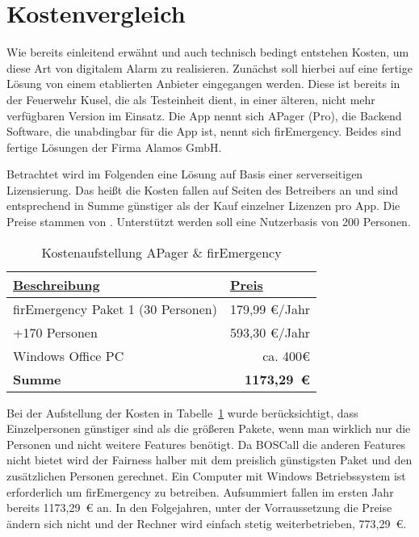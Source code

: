 \section{Kostenvergleich}
\label{sec:kostenvergleich}
Wie bereits einleitend erwähnt und auch technisch bedingt entstehen Kosten, um diese Art von digitalem Alarm zu realisieren. Zunächst soll hierbei auf eine fertige Lösung von einem etablierten Anbieter eingegangen werden. Diese ist bereits in der Feuerwehr Kusel, die als Testeinheit dient, in einer älteren, nicht mehr verfügbaren Version im Einsatz. Die App nennt sich APager (Pro), die Backend Software, die unabdingbar für die App ist, nennt sich firEmergency. Beides sind fertige Lösungen der Firma Alamos GmbH.

Betrachtet wird im Folgenden eine Lösung auf Basis einer serverseitigen Lizensierung. Das heißt die Kosten fallen auf Seiten des Betreibers an und sind entsprechend in Summe günstiger als der Kauf einzelner Lizenzen pro App. Die Preise stammen von \cite{Alamos:FE2Pricing}. Unterstützt werden soll eine Nutzerbasis von 200 Personen.
\begin{table}[H]
	\centering
	\caption{Kostenaufstellung APager \& firEmergency}
	\label{tbl:FE2Pricing}
	\begin{tabular}{|l|r|}
		\hline
		{\ul \textbf{Beschreibung}}        & \multicolumn{1}{l|}{{\ul \textbf{Preis}}} \\ \hline
		firEmergency Paket 1 (30 Personen) & 179,99 €/Jahr                             \\ \hline
		+170 Personen                      & 593,30 €/Jahr                             \\ \hline
		Windows Office PC                  & ca. 400€                                  \\ \hline\hline
		\textbf{Summe}                  & \textbf{1173,29~€}                                  \\ \hline
	\end{tabular}
\end{table}

Bei der Aufstellung der Kosten in Tabelle~\ref{tbl:FE2Pricing} wurde berücksichtigt, dass Einzelpersonen günstiger sind als die größeren Pakete, wenn man wirklich nur die Personen und nicht weitere Features benötigt. Da BOSCall die anderen Features nicht bietet wird der Fairness halber mit dem preislich günstigsten Paket und den zusätzlichen Personen gerechnet. Ein Computer mit Windows Betriebssystem ist erforderlich um firEmergency zu betreiben.\cite{Alamos:FE2SystemRequirements} Aufsummiert fallen im ersten Jahr bereits 1173,29~€ an. In den Folgejahren, unter der Vorraussetzung die Preise ändern sich nicht und der Rechner wird einfach stetig weiterbetrieben, 773,29~€.

